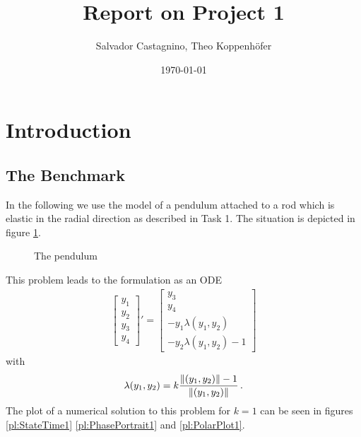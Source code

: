 \documentclass{scrartcl}
\title{Report on Project 1}
\author{Salvador Castagnino, Theo Koppenhöfer}
\date{\today}
\DeclarePairedDelimiter{\norm}{\lVert}{\rVert}
\newcommand{\vect}[1]{\begin{bmatrix} #1 \end{bmatrix}}
\begin{document}
\maketitle

\section*{Introduction}

\subsection*{The Benchmark}

In the following we use the model of a pendulum attached to a rod which is elastic in the radial direction as described in Task 1. The situation is depicted in figure \ref{dr:Pendulum}.

\begin{figure}
\centering

\caption{The pendulum}
\label{dr:Pendulum}
\end{figure}

This problem leads to the formulation as an ODE
\begin{align*}
	\vect{y_1 \\ y_2 \\ y_3 \\ y_4}' = \vect{y_3 \\ y_4 \\ -y_1\lambda(y_1,y_2) \\ -y_2\lambda(y_1,y_2)-1}
\end{align*}
with
\begin{align*}
	\lambda(y_1,y_2)=k\frac{\norm{(y_1,y_2)}-1}{\norm{(y_1,y_2)}}\,.
\end{align*}
The plot of a numerical solution to this problem for $k=1$ can be seen in figures \ref{pl:StateTime1} \ref{pl:PhasePortrait1} and \ref{pl:PolarPlot1}.
\end{document}
